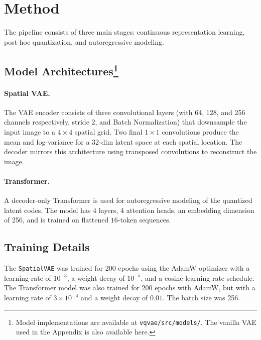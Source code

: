 \documentclass{article}
\begin{document}
\section{Method}
The pipeline consists of three main stages: continuous representation learning, post-hoc quantization, and autoregressive modeling.

\subsection{Model Architectures\protect\footnote{Model implementations are available at \texttt{vqvae/src/models/}. The vanilla VAE used in the Appendix is also available here.}}
\paragraph{Spatial VAE.} The VAE encoder consists of three convolutional layers (with 64, 128, and 256 channels respectively, stride 2, and Batch Normalization) that downsample the input image to a $4 \times 4$ spatial grid. 
Two final $1 \times 1$ convolutions produce the mean and log-variance for a 32-dim latent space at each spatial location. The decoder mirrors this architecture using transposed convolutions to reconstruct the image.

\paragraph{Transformer.} A decoder-only Transformer is used for autoregressive modeling of the quantized latent codes. The model has 4 layers, 4 attention heads, an embedding dimension of 256, and is trained on flattened $16$-token sequences.

\subsection{Training Details}
The \texttt{SpatialVAE} was trained for 200 epochs using the AdamW optimizer with a learning rate of $10^{-3}$, a weight decay of $10^{-5}$, and a cosine learning rate schedule. The Transformer model was also trained for 200 epochs with AdamW, but with a learning rate of $3 \times 10^{-4}$ and a weight decay of $0.01$. The batch size was 256.
\end{document}
